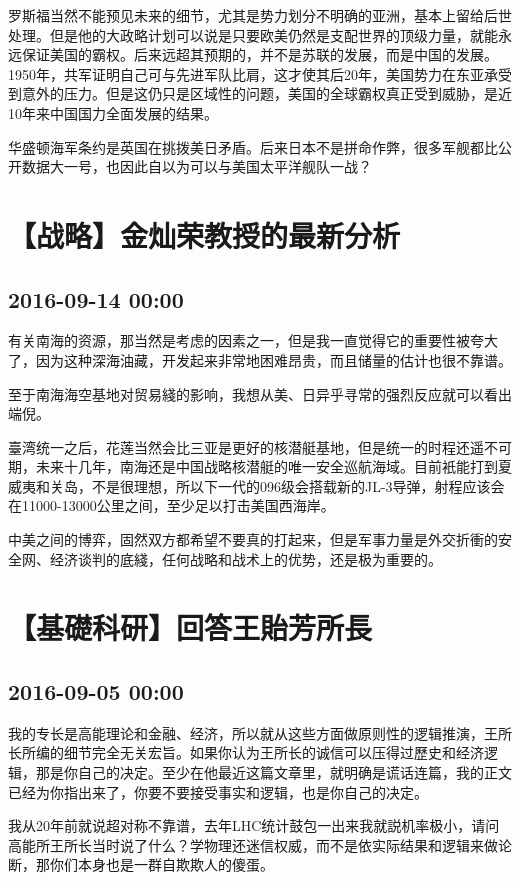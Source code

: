 \documentclass[twocolumn]{ctexart}
\begin{document}
罗斯福当然不能预见未来的细节，尤其是势力划分不明确的亚洲，基本上留给后世处理。但是他的大政略计划可以说是只要欧美仍然是支配世界的顶级力量，就能永远保证美国的霸权。后来远超其预期的，并不是苏联的发展，而是中国的发展。1950年，共军证明自己可与先进军队比肩，这才使其后20年，美国势力在东亚承受到意外的压力。但是这仍只是区域性的问题，美国的全球霸权真正受到威胁，是近10年来中国国力全面发展的结果。

华盛顿海军条约是英国在挑拨美日矛盾。后来日本不是拼命作弊，很多军舰都比公开数据大一号，也因此自以为可以与美国太平洋舰队一战？\section*{【战略】金灿荣教授的最新分析}
\subsection*{2016-09-14 00:00}
有关南海的资源，那当然是考虑的因素之一，但是我一直觉得它的重要性被夸大了，因为这种深海油藏，开发起来非常地困难昂贵，而且储量的估计也很不靠谱。

至于南海海空基地对贸易綫的影响，我想从美、日异乎寻常的强烈反应就可以看出端倪。

臺湾统一之后，花莲当然会比三亚是更好的核潜艇基地，但是统一的时程还遥不可期，未来十几年，南海还是中国战略核潜艇的唯一安全巡航海域。目前衹能打到夏威夷和关岛，不是很理想，所以下一代的096级会搭载新的JL-3导弹，射程应该会在11000-13000公里之间，至少足以打击美国西海岸。

中美之间的博弈，固然双方都希望不要真的打起来，但是军事力量是外交折衝的安全网、经济谈判的底綫，任何战略和战术上的优势，还是极为重要的。\section*{【基礎科研】回答王貽芳所長}
\subsection*{2016-09-05 00:00}
我的专长是高能理论和金融、经济，所以就从这些方面做原则性的逻辑推演，王所长所编的细节完全无关宏旨。如果你认为王所长的诚信可以压得过歷史和经济逻辑，那是你自己的决定。至少在他最近这篇文章里，就明确是谎话连篇，我的正文已经为你指出来了，你要不要接受事实和逻辑，也是你自己的决定。

我从20年前就说超对称不靠谱，去年LHC统计鼓包一出来我就説机率极小，请问高能所王所长当时说了什么？学物理还迷信权威，而不是依实际结果和逻辑来做论断，那你们本身也是一群自欺欺人的傻蛋。
\end{document}
